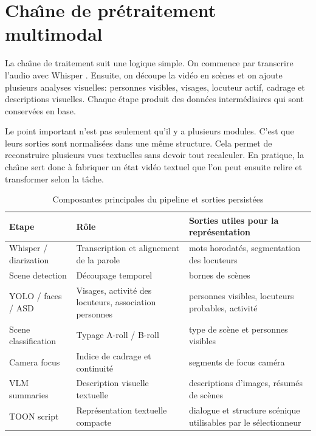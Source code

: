 \section{Cha\^\i ne de pr\'etraitement multimodal}

La cha\^\i ne de traitement suit une logique simple. On commence par transcrire l'audio avec Whisper \cite{radford2023_whisper}. Ensuite, on d\'ecoupe la vid\'eo en sc\`enes et on ajoute plusieurs analyses visuelles: personnes visibles, visages, locuteur actif, cadrage et descriptions visuelles. Chaque \'etape produit des donn\'ees interm\'ediaires qui sont conserv\'ees en base.

Le point important n'est pas seulement qu'il y a plusieurs modules. C'est que leurs sorties sont normalis\'ees dans une m\^eme structure. Cela permet de reconstruire plusieurs vues textuelles sans devoir tout recalculer. En pratique, la cha\^\i ne sert donc \`a fabriquer un \'etat vid\'eo textuel que l'on peut ensuite relire et transformer selon la t\^ache.

\begin{table}[ht]
\centering
\caption{Composantes principales du pipeline et sorties persist\'ees}
\label{tab:pipeline-components}
\begin{tabularx}{\textwidth}{>{\raggedright\arraybackslash}p{} >{\raggedright\arraybackslash}p{} >{\raggedright\arraybackslash}X}
\toprule
Etape & R\^ole & Sorties utiles pour la repr\'esentation \\
\midrule
Whisper / diarization & Transcription et alignement de la parole & mots horodat\'es, segmentation des locuteurs \\
Scene detection & D\'ecoupage temporel & bornes de sc\`enes \\
YOLO / faces / ASD & Visages, activit\'e des locuteurs, association personnes & personnes visibles, locuteurs probables, activit\'e \\
Scene classification & Typage A-roll / B-roll & type de sc\`ene et personnes visibles \\
Camera focus & Indice de cadrage et continuit\'e & segments de focus cam\'era \\
VLM summaries & Description visuelle textuelle & descriptions d'images, r\'esum\'es de sc\`enes \\
TOON script & Repr\'esentation textuelle compacte & dialogue et structure sc\'enique utilisables par le s\'electionneur \\
\bottomrule
\end{tabularx}
\end{table}

